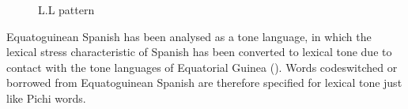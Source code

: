 \begin{figure} 
\caption{L.L pattern}
\label{fig:key:3.8}
\end{figure}

 
Equatoguinean Spanish has been analysed as a tone language, in which the lexical stress characteristic of Spanish has been converted to lexical tone due to contact with the tone languages of Equatorial Guinea (\citealt{Lipski2015,SteienYakpo2017}). Words codeswitched or borrowed from Equatoguinean Spanish are therefore specified for lexical tone just like Pichi words. 


